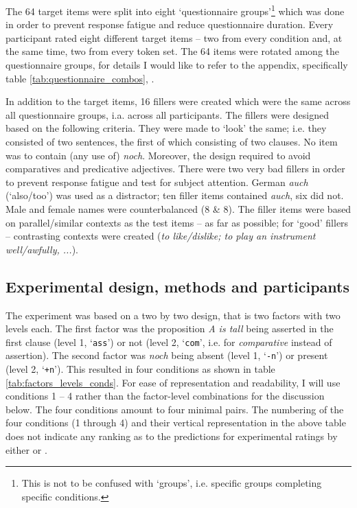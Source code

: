 \documentclass[output=paper,
modfonts
]{langscibook}
\begin{document}
The 64 target items were split into eight `questionnaire groups'\footnote{ This is not to be confused with `groups', i.e. specific groups completing specific conditions.} which was done in order to prevent response fatigue and reduce questionnaire duration. Every participant rated eight different target items -- two from every condition and, at the same time, two from every token set. The 64 items were rotated among the questionnaire groups, for details I would like to refer to the appendix, specifically table \ref{tab:questionnaire_combos}, \pageref{tab:questionnaire_combos}.

In addition to the target items, 16 fillers were created which were the same across all questionnaire groups, i.a. across all participants. The fillers were designed based on the following criteria. They were made to `look' the same; i.e. they consisted of two sentences, the first of which consisting of two clauses. No item was to contain (any use of) \textit{noch}. Moreover, the design required to avoid comparatives and predicative adjectives. There were two very bad fillers in order to prevent response fatigue and test for subject attention. German \textit{auch} (`also/too') was used as a distractor; ten filler items contained \textit{auch}, six did not. Male and female names were counterbalanced (8 \& 8). The filler items were based on parallel/similar contexts as the test items -- as far as possible; for `good' fillers -- contrasting contexts were created (\textit{to like/dislike; to play an instrument well/awfully, ...}).


\subsection{Experimental design, methods and participants}\label{experimental_design_and_methods}

The experiment was based on a two by two design, that is two factors with two levels each. The first factor was the proposition \textit{A is tall} being asserted in the first clause (level 1, `\texttt{ass}') or not (level 2, `\texttt{com}', i.e. for \textit{comparative} instead of assertion). The second factor was \textit{noch} being absent (level 1, `\texttt{-n}') or present (level 2, `\texttt{+n}'). This resulted in four conditions as shown in table \ref{tab:factors_levels_conds}. For ease of representation and readability, I will use conditions 1 -- 4 rather than the factor-level combinations for the discussion below. The four conditions amount to four minimal pairs. The numbering of the four conditions (1 through 4) and their vertical representation in the above table does not indicate any ranking as to the predictions for experimental ratings by either \citeauthor{umbach2009a_comp} or \citeauthor{Hofstetter2013}. 
\end{document}
